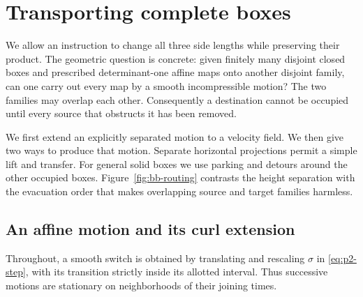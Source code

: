 \section{Transporting complete boxes}
\label{sec:bb-boxes}

We allow an instruction to change all three side lengths while
preserving their product. The geometric question is concrete:
given finitely many disjoint closed boxes and prescribed determinant-one
affine maps onto another disjoint family, can one carry out every map by
a smooth incompressible motion?  The two families may overlap each
other.  Consequently a destination cannot be occupied until every source
that obstructs it has been removed.

We first extend an explicitly separated motion to a velocity field.
We then give two ways to produce that motion.  Separate horizontal
projections permit a simple lift and transfer.  For general solid boxes
we use parking and detours around the other occupied boxes.
Figure~\ref{fig:bb-routing} contrasts the height separation with the
evacuation order that makes overlapping source and target families harmless.

\subsection{An affine motion and its curl extension}

Throughout, a smooth switch is obtained by translating and rescaling
$\sigma$ in \eqref{eq:p2-step}, with its transition strictly inside
its allotted interval.  Thus successive motions are stationary on
neighborhoods of their joining times.

